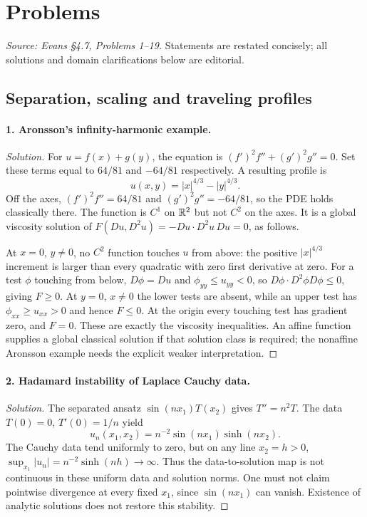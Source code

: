 \Needspace{65mm}
\section{Problems}\label{sec:4-7}
\noindent\emph{Source: Evans \S4.7, Problems 1--19.}
Statements are restated concisely; all solutions and domain
clarifications below are editorial.

\Needspace{35mm}
\subsection{Separation, scaling and traveling profiles}
\Needspace{30mm}
\paragraph{1. Aronsson's infinity-harmonic example.}
\begin{proof}[Solution]
For $u=f(x)+g(y)$, the equation is
$(f')^2f''+(g')^2g''=0$.
Set these terms equal to $64/81$ and $-64/81$ respectively.
A resulting profile is
\[
 u(x,y)=|x|^{4/3}-|y|^{4/3}.
\]
Off the axes, $(f')^2f''=64/81$ and
$(g')^2g''=-64/81$, so the PDE holds classically there.
The function is $C^1$ on $\mathbb{R}^2$ but not $C^2$ on the axes.
It is a global viscosity solution of
$F(Du,D^2u)=-Du\cdot D^2u\,Du=0$, as follows.

At $x=0$, $y\ne0$, no $C^2$ function touches $u$ from above:
the positive $|x|^{4/3}$ increment is larger than every quadratic
with zero first derivative at zero.
For a test $\phi$ touching from below, $D\phi=Du$ and
$\phi_{yy}\leq u_{yy}<0$, so
$D\phi\cdot D^2\phi D\phi\leq0$, giving $F\geq0$.
At $y=0$, $x\ne0$ the lower tests are absent, while an upper test has
$\phi_{xx}\geq u_{xx}>0$ and hence $F\leq0$.
At the origin every touching test has gradient zero, and $F=0$.
These are exactly the viscosity inequalities.
An affine function supplies a global classical solution if that
solution class is required; the nonaffine Aronsson example needs the
explicit weaker interpretation.
\end{proof}
\Needspace{45mm}

\Needspace{30mm}
\paragraph{2. Hadamard instability of Laplace Cauchy data.}
\begin{proof}[Solution]
The separated ansatz $\sin(nx_1)T(x_2)$ gives $T''=n^2T$.
The data $T(0)=0$, $T'(0)=1/n$ yield
\[
 u_n(x_1,x_2)=n^{-2}\sin(nx_1)\sinh(nx_2).
\]
The Cauchy data tend uniformly to zero, but on any line $x_2=h>0$,
$\sup_{x_1}|u_n|=n^{-2}\sinh(nh)\to\infty$.
Thus the data-to-solution map is not continuous in these uniform
data and solution norms. One must not claim pointwise divergence
at every fixed $x_1$, since $\sin(nx_1)$ can vanish.
Existence of analytic solutions does not restore this stability.
\end{proof}

